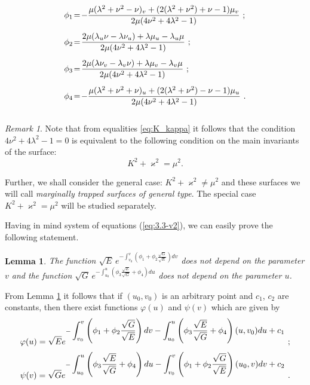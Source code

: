 \documentclass[12pt]{amsart}
\newtheorem{lem}[thm]{Lemma}
\theoremstyle{definition}
\theoremstyle{remark}
\newtheorem{remark}{Remark}[section]
\newcommand{\ds}{\displaystyle}
\numberwithin{equation}{section}
\begin{document}
\begin{equation} \label{eq:functions}
	\begin{array}{l}
		\vspace{3mm}
		\phi_1 \!= \! \ds{-\frac{\mu(\lambda^2+\nu^2-\nu)_v + (2(\lambda^2+\nu^2)+\nu-1)\mu_v }{2\mu(4\nu^2+4\lambda^2-1) } } \ ; \\
		\vspace{3mm}
		\phi_2 \!=  \! \ds{\frac{2\mu(\lambda_u\nu-\lambda\nu_u) +\lambda\mu_u-\lambda_u\mu }{2\mu(4\nu^2+4\lambda^2-1) } } \ ;\\
		\vspace{3mm}
		\phi_3 \!= \! \ds{\frac{2\mu(\lambda\nu_v -\lambda_v\nu) +\lambda\mu_v-\lambda_v\mu }{2\mu(4\nu^2+4\lambda^2-1) } }\ ; \\
		\vspace{3mm}
		\phi_4 \!= \! \ds{-\frac{\mu(\lambda^2+\nu^2+\nu)_u + (2(\lambda^2+\nu^2)-\nu-1)\mu_u  }{2\mu(4\nu^2+4\lambda^2-1) } } \ .
	\end{array}
\end{equation}


\begin{remark}
Note that from equalities \eqref{eq:K_kappa} it follows that the condition $4\nu^2+4\lambda^2-1 = 0$ is equivalent to the following condition on the main invariants of the surface:
$$K^2+\varkappa^2 =\mu^2.$$
\end{remark}

Further, we shall consider the general case: $K^2+\varkappa^2 \neq \mu^2$ and these surfaces we will call \textit{marginally trapped surfaces of general type}. The special case $K^2+\varkappa^2 =\mu^2$ will be studied separately.

\vskip 2mm
Having in mind system of equations (\ref{eq:3.3-v2}), we can easily prove the following statement.

\begin{lem} \label{lemma:ConstantFunctions} The function $\sqrt E\, e^{-\ds\int_{v_0}^v\left(\phi_1+\phi_2\frac{\sqrt G}{\sqrt E}\right)dv} $ does not depend on the parameter $v$ and the function 
	$\sqrt G\, e^{-\ds\int_{u_0}^u\left(\phi_3\frac{\sqrt E}{\sqrt G}+\phi_4\right)du}$
	does not depend on the parameter $u$.
\end{lem}


From Lemma \ref{lemma:ConstantFunctions} it follows that if $(u_0,v_0)$ is an arbitrary point  and $c_1$, $c_2$ are constants, then 
there exist functions $\varphi(u)$ and $\psi(v)$ which are given by
\begin{equation} \label{eq:phi-psi}
	\begin{array}{l} 
		\vspace{2mm}
		\varphi(u) = \ds\sqrt Ee^{-\ds\int_{v_0}^v\left(\phi_1+\phi_2\frac{\sqrt G}{\sqrt E}\right)dv
			-\int_{u_0}^u\left(\phi_3\frac{\sqrt E}{\sqrt G}+\phi_4\right)(u,v_0)du+c_1}\ ;  \\
		\vspace{2mm}
		\psi(v) = \ds\sqrt Ge^{-\ds\int_{u_0}^u\left(\phi_3\frac{\sqrt E}{\sqrt G}+\phi_4\right)du
			-\int_{v_0}^v\left(\phi_1+\phi_2\frac{\sqrt G}{\sqrt E}\right)(u_0,v)dv+c_2} \ .
	\end{array}   
\end{equation}
\end{document}
